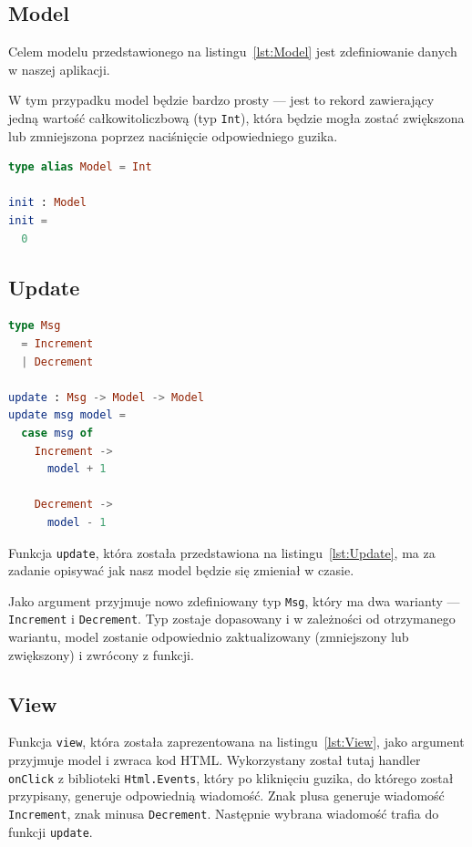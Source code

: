 \documentclass[twoside,a4paper]{report}
\begin{document}
\subsection{Model}
\begin{minipage}{.50\textwidth}
    Celem modelu przedstawionego na listingu~\ref{lst:Model} jest zdefiniowanie danych w naszej aplikacji.

    W tym przypadku model będzie bardzo prosty --- jest to rekord zawierający jedną wartość całkowitoliczbową (typ \texttt{Int}), która będzie mogła zostać zwiększona lub zmniejszona poprzez naciśnięcie odpowiedniego guzika.
\end{minipage}\hfill
\begin{minipage}{.43\textwidth}
\begin{lstlisting}[caption={\textit{The Elm Architecture} --- Model},label={lst:Model},language={Elm}]
type alias Model = Int

init : Model
init =
  0
    \end{lstlisting}
\end{minipage}\hfill

\subsection{Update}
\begin{minipage}{.43\textwidth}
    \begin{lstlisting}[caption={\textit{The Elm Architecture} --- Update},label={lst:Update},language={Elm}]
type Msg
  = Increment
  | Decrement

update : Msg -> Model -> Model
update msg model =
  case msg of
    Increment ->
      model + 1

    Decrement ->
      model - 1
    \end{lstlisting}
\end{minipage}\hfill
\begin{minipage}{.50\textwidth}
    Funkcja \texttt{update}, która została przedstawiona na listingu~\ref{lst:Update}, ma za zadanie opisywać jak nasz model będzie się zmieniał w czasie.

    Jako argument przyjmuje nowo zdefiniowany typ \texttt{Msg}, który ma dwa warianty --- \texttt{Increment} i \texttt{Decrement}.
    Typ zostaje dopasowany i w zależności od otrzymanego wariantu, model zostanie odpowiednio zaktualizowany (zmniejszony lub zwiększony) i zwrócony z funkcji.
\end{minipage}\hfill

\subsection{View}
Funkcja \texttt{view}, która została zaprezentowana na listingu~\ref{lst:View}, jako argument przyjmuje model i zwraca kod HTML\@.
Wykorzystany został tutaj handler \texttt{onClick} z biblioteki \texttt{Html.Events}, który po kliknięciu guzika, do którego został przypisany, generuje odpowiednią wiadomość.
Znak plusa generuje wiadomość \texttt{Increment}, znak minusa \texttt{Decrement}.
Następnie wybrana wiadomość trafia do funkcji \texttt{update}.
\end{document}
